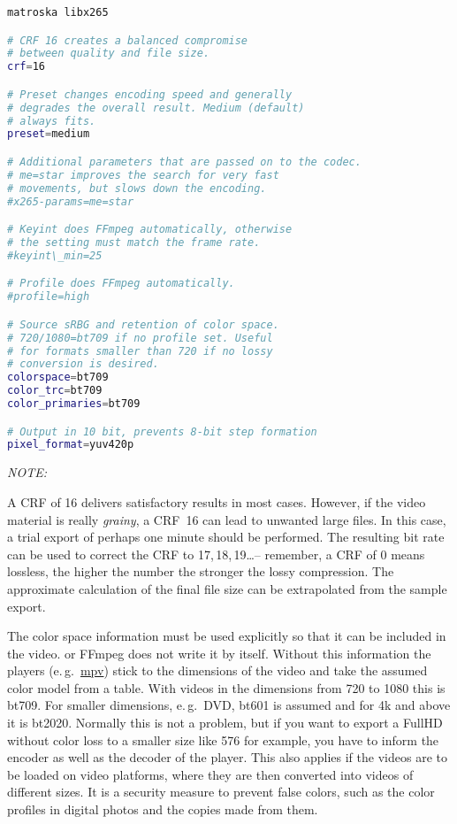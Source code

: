 \vspace{2ex} \begin{lstlisting}[language=bash,numbers=none]
matroska libx265

# CRF 16 creates a balanced compromise
# between quality and file size. 
crf=16

# Preset changes encoding speed and generally
# degrades the overall result. Medium (default)
# always fits.
preset=medium

# Additional parameters that are passed on to the codec.
# me=star improves the search for very fast
# movements, but slows down the encoding.
#x265-params=me=star

# Keyint does FFmpeg automatically, otherwise
# the setting must match the frame rate.
#keyint\_min=25

# Profile does FFmpeg automatically.
#profile=high

# Source sRBG and retention of color space.
# 720/1080=bt709 if no profile set. Useful
# for formats smaller than 720 if no lossy
# conversion is desired.
colorspace=bt709
color_trc=bt709
color_primaries=bt709

# Output in 10 bit, prevents 8-bit step formation
pixel_format=yuv420p
\end{lstlisting}

\noindent \textit{NOTE:}

A CRF of 16 delivers satisfactory results in most cases. However, if
the video material is really \emph{grainy}, a CRF~16 can lead to unwanted large files.  In this case, a trial export of perhaps one minute should be performed. The resulting bit rate can be used to correct the CRF to 17,\,18,\,19\ldots -- remember, a CRF of 0 means lossless, the higher the number the stronger the lossy compression. The approximate calculation of the final file size can be extrapolated from the sample export.

The color space information must be used explicitly so that it can
be included in the video. \CGG{} or FFmpeg does not write it
by itself. Without this information the players (e.\,g.\ \href{https://mpv.io/}{mpv}) stick to the dimensions of the video and take the assumed color model from a table. With videos in the dimensions from 720 to 1080 this is bt709. For smaller dimensions, e.\,g.\ DVD, bt601 is assumed and for 4k and above it is bt2020. Normally this is not a problem, but if you want to export a FullHD without color loss to a smaller size like 576 for example, you have to inform the encoder as well as the decoder of the player. This also applies if the videos are to be loaded on video platforms, where they are then converted into videos of different sizes. It is a security measure to prevent false colors, such as the color profiles in digital photos and the copies made from them.

